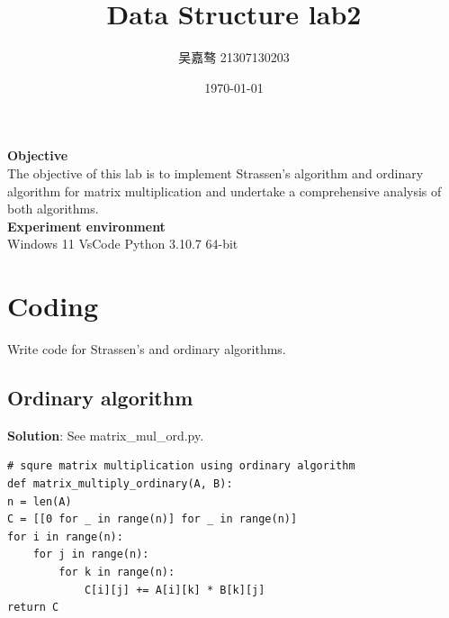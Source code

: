 \documentclass[UTF8]{ctexart}
\title{\textbf{Data Structure lab2}}
\author{吴嘉骜 21307130203}
\date{\today}
\begin{document}
\maketitle

\noindent
\textbf {Objective}\\  The objective of this lab is to implement Strassen’s algorithm and ordinary algorithm for matrix multiplication and undertake a
comprehensive analysis of both algorithms. \\
\noindent
\textbf {Experiment environment} \\
    Windows 11 VsCode Python 3.10.7 64-bit

\section{Coding}
\setlength{\parindent}{0pt}
Write code for Strassen's and ordinary algorithms.
\subsection{Ordinary algorithm}
\textbf{Solution}: See matrix\_mul\_ord.py.
\begin{lstlisting}
# squre matrix multiplication using ordinary algorithm
def matrix_multiply_ordinary(A, B):
n = len(A)
C = [[0 for _ in range(n)] for _ in range(n)]
for i in range(n):
    for j in range(n):
        for k in range(n):
            C[i][j] += A[i][k] * B[k][j]
return C
\end{lstlisting}
\end{document}
